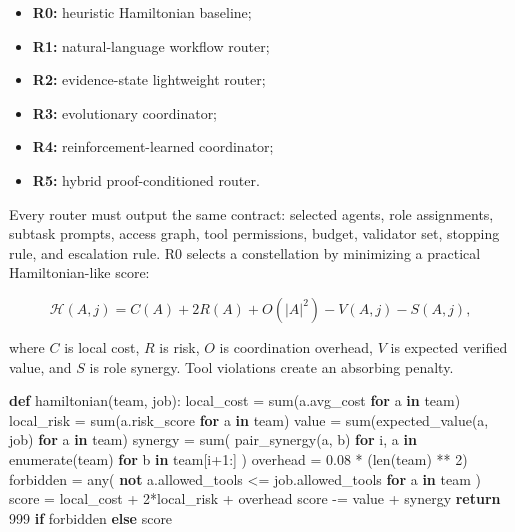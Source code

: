 \documentclass[
  11pt,
]{article}
\newenvironment{Shaded}{}{}
\newcommand{\BuiltInTok}[1]{\textcolor[rgb]{0.00,0.50,0.00}{#1}}
\newcommand{\ControlFlowTok}[1]{\textcolor[rgb]{0.00,0.44,0.13}{\textbf{#1}}}
\newcommand{\DecValTok}[1]{\textcolor[rgb]{0.25,0.63,0.44}{#1}}
\newcommand{\FloatTok}[1]{\textcolor[rgb]{0.25,0.63,0.44}{#1}}
\newcommand{\KeywordTok}[1]{\textcolor[rgb]{0.00,0.44,0.13}{\textbf{#1}}}
\newcommand{\NormalTok}[1]{#1}
\newcommand{\OperatorTok}[1]{\textcolor[rgb]{0.40,0.40,0.40}{#1}}
\providecommand{\tightlist}{%
  \setlength{\itemsep}{0pt}\setlength{\parskip}{0pt}}
\begin{document}
\begin{itemize}
\tightlist
\item
  \textbf{R0:} heuristic Hamiltonian baseline;
\item
  \textbf{R1:} natural-language workflow router;
\item
  \textbf{R2:} evidence-state lightweight router;
\item
  \textbf{R3:} evolutionary coordinator;
\item
  \textbf{R4:} reinforcement-learned coordinator;
\item
  \textbf{R5:} hybrid proof-conditioned router.
\end{itemize}

Every router must output the same contract: selected agents, role
assignments, subtask prompts, access graph, tool permissions, budget,
validator set, stopping rule, and escalation rule. R0 selects a
constellation by minimizing a practical Hamiltonian-like score:

\[
\mathcal{H}(A,j)
=
C(A)+2R(A)+O(|A|^2)-V(A,j)-S(A,j),
\]

where \(C\) is local cost, \(R\) is risk, \(O\) is coordination
overhead, \(V\) is expected verified value, and \(S\) is role synergy.
Tool violations create an absorbing penalty.

\begin{Shaded}
\begin{Highlighting}[]
\KeywordTok{def}\NormalTok{ hamiltonian(team, job):}
\NormalTok{    local\_cost }\OperatorTok{=} \BuiltInTok{sum}\NormalTok{(a.avg\_cost }\ControlFlowTok{for}\NormalTok{ a }\KeywordTok{in}\NormalTok{ team)}
\NormalTok{    local\_risk }\OperatorTok{=} \BuiltInTok{sum}\NormalTok{(a.risk\_score }\ControlFlowTok{for}\NormalTok{ a }\KeywordTok{in}\NormalTok{ team)}
\NormalTok{    value }\OperatorTok{=} \BuiltInTok{sum}\NormalTok{(expected\_value(a, job) }\ControlFlowTok{for}\NormalTok{ a }\KeywordTok{in}\NormalTok{ team)}
\NormalTok{    synergy }\OperatorTok{=} \BuiltInTok{sum}\NormalTok{(}
\NormalTok{        pair\_synergy(a, b)}
        \ControlFlowTok{for}\NormalTok{ i, a }\KeywordTok{in} \BuiltInTok{enumerate}\NormalTok{(team)}
        \ControlFlowTok{for}\NormalTok{ b }\KeywordTok{in}\NormalTok{ team[i}\OperatorTok{+}\DecValTok{1}\NormalTok{:]}
\NormalTok{    )}
\NormalTok{    overhead }\OperatorTok{=} \FloatTok{0.08} \OperatorTok{*}\NormalTok{ (}\BuiltInTok{len}\NormalTok{(team) }\OperatorTok{**} \DecValTok{2}\NormalTok{)}
\NormalTok{    forbidden }\OperatorTok{=} \BuiltInTok{any}\NormalTok{(}
        \KeywordTok{not}\NormalTok{ a.allowed\_tools }\OperatorTok{\textless{}=}\NormalTok{ job.allowed\_tools}
        \ControlFlowTok{for}\NormalTok{ a }\KeywordTok{in}\NormalTok{ team}
\NormalTok{    )}
\NormalTok{    score }\OperatorTok{=}\NormalTok{ local\_cost }\OperatorTok{+} \DecValTok{2}\OperatorTok{*}\NormalTok{local\_risk }\OperatorTok{+}\NormalTok{ overhead}
\NormalTok{    score }\OperatorTok{{-}=}\NormalTok{ value }\OperatorTok{+}\NormalTok{ synergy}
    \ControlFlowTok{return} \DecValTok{999} \ControlFlowTok{if}\NormalTok{ forbidden }\ControlFlowTok{else}\NormalTok{ score}
\end{Highlighting}
\end{Shaded}
\end{document}
